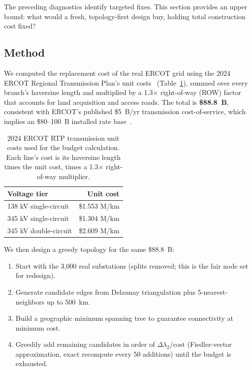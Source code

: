 \documentclass[12pt,letterpaper]{article}
\begin{document}
The preceding diagnostics identify targeted fixes. This section provides an upper bound: what would a fresh, topology-first design buy, holding total construction cost fixed?

\subsection{Method}

We computed the replacement cost of the real ERCOT grid using the 2024 ERCOT Regional Transmission Plan's unit costs~\cite{ercot2024rtp} (Table~\ref{tab:unit_costs}), summed over every branch's haversine length and multiplied by a 1.3$\times$ right-of-way (ROW) factor that accounts for land acquisition and access roads. The total is \textbf{\$88.8~B}, consistent with ERCOT's published \$5~B/yr transmission cost-of-service, which implies an \$80--100~B installed rate base~\cite{lifepowered2026}.

\begin{table}[h]
\centering
\caption{2024 ERCOT RTP transmission unit costs used for the budget calculation. Each line's cost is its haversine length times the unit cost, times a 1.3$\times$ right-of-way multiplier.}
\label{tab:unit_costs}
\begin{tabular}{@{}lr@{}}
\toprule
\textbf{Voltage tier} & \textbf{Unit cost} \\
\midrule
138 kV single-circuit & \$1.553 M/km \\
345 kV single-circuit & \$1.304 M/km \\
345 kV double-circuit & \$2.609 M/km \\
\bottomrule
\end{tabular}
\end{table}

We then design a greedy topology for the same \$88.8~B:

\begin{enumerate}
    \item Start with the 3{,}000 real substations (splits removed; this is the fair node set for redesign).
    \item Generate candidate edges from Delaunay triangulation plus 5-nearest-neighbors up to 500~km.
    \item Build a geographic minimum spanning tree to guarantee connectivity at minimum cost.
    \item Greedily add remaining candidates in order of $\Delta\lambda_2/\text{cost}$ (Fiedler-vector approximation, exact recompute every 50 additions) until the budget is exhausted.
\end{enumerate}
\end{document}
